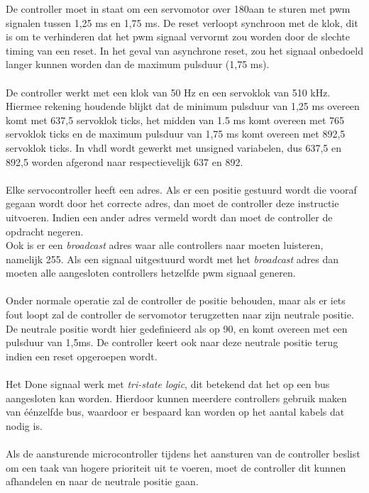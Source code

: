 De controller moet in staat om een servomotor over 180\textdegree \space aan te sturen met \gls{pwm} signalen tussen 1,25 ms en 1,75 ms. De reset verloopt synchroon met de klok, dit is om te verhinderen dat het \gls{pwm} signaal vervormt zou worden door de slechte timing van een reset. In het geval van asynchrone reset, zou het  signaal onbedoeld langer kunnen worden dan de maximum pulsduur (1,75 ms).\\
\\
De controller werkt met een klok van 50 Hz en een servoklok van 510 kHz. Hiermee rekening houdende blijkt dat de minimum pulsduur van 1,25 ms overeen komt met 637,5 servoklok ticks, het midden van 1.5 ms komt overeen met 765 servoklok ticks en de maximum pulsduur van 1,75 ms komt overeen met 892,5 servoklok ticks. In \gls{vhdl} wordt gewerkt met unsigned variabelen, dus 637,5 en 892,5 worden afgerond naar respectievelijk 637 en 892.\\
\\
Elke servocontroller heeft een adres. Als er een positie gestuurd wordt die vooraf gegaan wordt door het correcte adres, dan moet de controller deze instructie uitvoeren. Indien een ander adres vermeld wordt dan moet de controller de opdracht negeren.\\
Ook is er een \textit{broadcast} adres waar alle controllers  naar moeten luisteren, namelijk 255. Als een signaal uitgestuurd wordt met het \textit{broadcast} adres dan moeten alle aangesloten controllers hetzelfde \gls{pwm} signaal generen.\\
\\
Onder normale operatie zal de controller de positie behouden, maar als er iets fout loopt zal de controller de servomotor terugzetten naar zijn neutrale positie. De neutrale positie wordt hier gedefinieerd als op 90\textdegree, en komt overeen met een pulsduur van 1,5ms. De controller keert ook naar deze neutrale positie terug indien een reset opgeroepen wordt.\\
\\
Het Done signaal werk met \textit{tri-state logic}, dit betekend dat het op een bus aangesloten kan worden. Hierdoor kunnen meerdere controllers gebruik maken van \'{e}\'{e}nzelfde bus, waardoor er bespaard kan worden op het aantal kabels dat nodig is.\\
\\
Als de aansturende microcontroller tijdens het aansturen van de controller beslist om een taak van hogere prioriteit uit te voeren, moet de controller dit kunnen afhandelen en naar de neutrale positie gaan.\\
